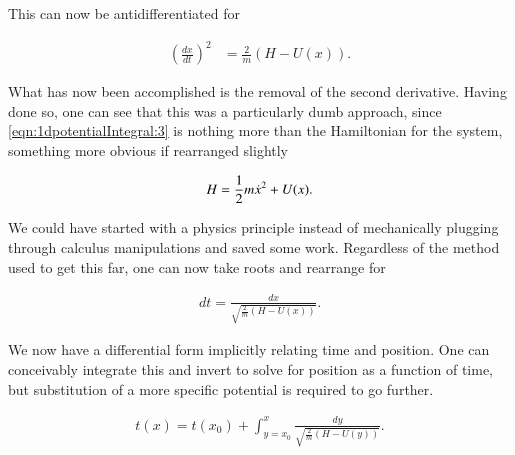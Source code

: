 This can now be antidifferentiated for

\begin{align}\label{eqn:1dpotentialIntegral:3}
\left( \frac{dx}{dt} \right)^2 &= \frac{2}{m} (H - U(x)).
\end{align}

What has now been accomplished is the removal of the second derivative.  Having done so, one can see that this was a particularly dumb approach, since \autoref{eqn:1dpotentialIntegral:3} is nothing more than the Hamiltonian for the system, something more obvious if rearranged slightly

\begin{align}\label{eqn:1dpotentialIntegral:3b}
H = \frac{1}{2} m \dot{x}^2 + U(x).
\end{align}

We could have started with a physics principle instead of mechanically plugging through calculus manipulations and saved some work.  Regardless of the method used to get this far, one can now take roots and rearrange for

\begin{align}\label{eqn:1dpotentialIntegral:4}
dt = \frac{dx}{\sqrt{ \frac{2}{m} (H - U(x)) } }.
\end{align}

We now have a differential form implicitly relating time and position.  One can conceivably integrate this and invert to solve for position as a function of time, but substitution of a more specific potential is required to go further.

\begin{align}\label{eqn:1dpotentialIntegral:5}
t(x) = t(x_0) + \int_{y=x_0}^{x} \frac{dy}{\sqrt{ \frac{2}{m} (H - U(y)) } }.
\end{align}


\EndNoBibArticle
